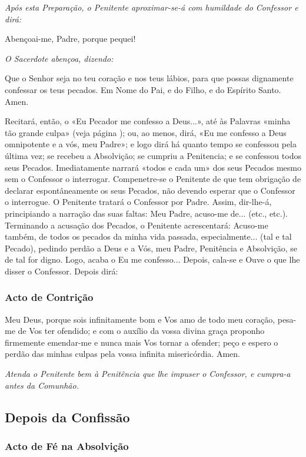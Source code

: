 \textit{Após esta Preparação, o Penitente aproximar-se-á com humildade do Confessor e dirá:}

Abençoai-me, Padre, porque pequei!

\textit{O Sacerdote abençoa, dizendo:}

Que o Senhor seja no teu coração e nos teus lábios, para que possas dignamente confessar os teus pecados. Em Nome do Pai, \cruz e do Filho, e do Espírito Santo. Amen.

Recitará, então, o «Eu Pecador me confesso a Deus...», até às Palavras «minha tão grande culpa» (veja página \pageref{confiteor}); ou, ao menos, dirá, «Eu me confesso a Deus omnipotente e a vós, meu Padre»; e logo dirá há quanto tempo se confessou pela última vez; se recebeu a Absolvição; se cumpriu a Penitencia; e se confessou todos seus Pecados. Imediatamente narrará «todos e cada um» dos seus Pecados mesmo sem o Confessor o interrogar. Compenetre-se o Penitente de que tem obrigação de declarar espontâneamente os seus Pecados, não devendo esperar que o Confessor o interrogue. O Penitente tratará o Confessor por Padre. Assim, dir-lhe-á, principiando a narração das suas faltas: Meu Padre, acuso-me de... (etc., etc.). Terminando a acusação dos Pecados, o Penitente acrescentará: Acuso-me também, de todos os pecados da minha vida passada, especialmente... (tal e tal Pecado), pedindo perdão a Deus e a Vós, meu Padre, Penitência e Absolvição, se de tal for digno. Logo, acaba o Eu me confesso... Depois, cala-se e Ouve o que lhe disser o Confessor. Depois dirá:

\subsubsection{Acto de Contrição}
Meu Deus, porque sois infinitamente bom e Vos amo de todo meu coração, pesa-me de Vos ter ofendido; e com o auxílio da vossa divina graça proponho firmemente emendar-me e nunca mais Vos tornar a ofender; peço e espero o perdão das minhas culpas pela vossa infinita misericórdia. Amen.

\textit{Atenda o Penitente bem à Penitência que lhe impuser o Confessor, e cumpra-a antes da Comunhão.}

\subsection{Depois da Confissão}

\subsubsection{Acto de Fé na Absolvição}

